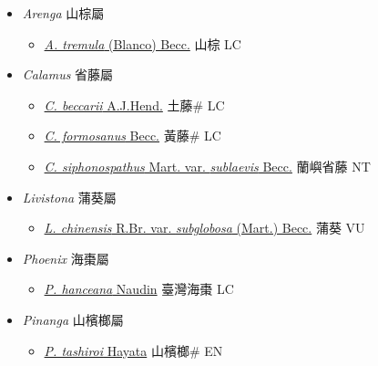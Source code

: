 
  \begin{itemize}
 \item[] \textit{Arenga} 山棕屬
                    
  \begin{itemize}
        \item[] \href{http://www.theplantlist.org/tpl1.1/search?q=Arenga+tremula}{\textit{A. tremula} (Blanco) Becc.}   山棕 LC
  \end{itemize}
 \item[] \textit{Calamus} 省藤屬
                    
  \begin{itemize}
        \item[] \href{http://www.theplantlist.org/tpl1.1/search?q=Calamus+beccarii}{\textit{C. beccarii} A.J.Hend.}   土藤\# LC
        \item[] \href{http://www.theplantlist.org/tpl1.1/search?q=Calamus+formosanus}{\textit{C. formosanus} Becc.}     黃藤\# LC
        \item[] \href{http://www.theplantlist.org/tpl1.1/search?q=Calamus+siphonospathus+var.+sublaevis}{\textit{C. siphonospathus} Mart. var. \textit{sublaevis} Becc.}   蘭嶼省藤 NT
  \end{itemize}
 \item[] \textit{Livistona} 蒲葵屬
                    
  \begin{itemize}
        \item[] \href{http://www.theplantlist.org/tpl1.1/search?q=Livistona+chinensis+var.+subglobosa}{\textit{L. chinensis} R.Br. var. \textit{subglobosa} (Mart.) Becc.}   蒲葵 VU
  \end{itemize}
 \item[] \textit{Phoenix} 海棗屬
                    
  \begin{itemize}
        \item[] \href{http://www.theplantlist.org/tpl1.1/search?q=Phoenix+hanceana}{\textit{P. hanceana} Naudin}   臺灣海棗 LC
  \end{itemize}
 \item[] \textit{Pinanga} 山檳榔屬
                    
  \begin{itemize}
        \item[] \href{http://www.theplantlist.org/tpl1.1/search?q=Pinanga+tashiroi}{\textit{P. tashiroi} Hayata}   山檳榔\# EN
  \end{itemize}
  \end{itemize}
